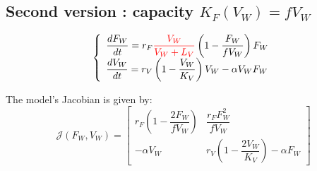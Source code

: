 \documentclass{article}
\begin{document}
%
%
%

\subsection{Second version : capacity $K_F(V_W) = f V_W$}

\begin{equation}
\left\lbrace \begin{array}{l}
\dfrac{dF_W}{dt} = r_F \textcolor{red}{\dfrac{V_W}{V_W + L_V}}\left(1 - \dfrac{F_W}{f V_W}\right) F_W \\
\dfrac{dV_W}{dt} = r_V \left(1 - \dfrac{V_W}{K_V}\right) V_W - \alpha V_W F_W
\end{array} \right.
\label{modelWild1}
\end{equation}

The model's Jacobian is given by:
\begin{equation}
\mathcal{J}(F_W, V_W) = \begin{bmatrix}
r_F \left(1 - \dfrac{2F_W}{fV_W}\right) & \dfrac{r_FF_W^2}{fV_W} \\
-\alpha V_W & r_V \left(1 - \dfrac{2V_W}{K_V}\right) - \alpha F_W
\end{bmatrix}
\end{equation}
\end{document}
